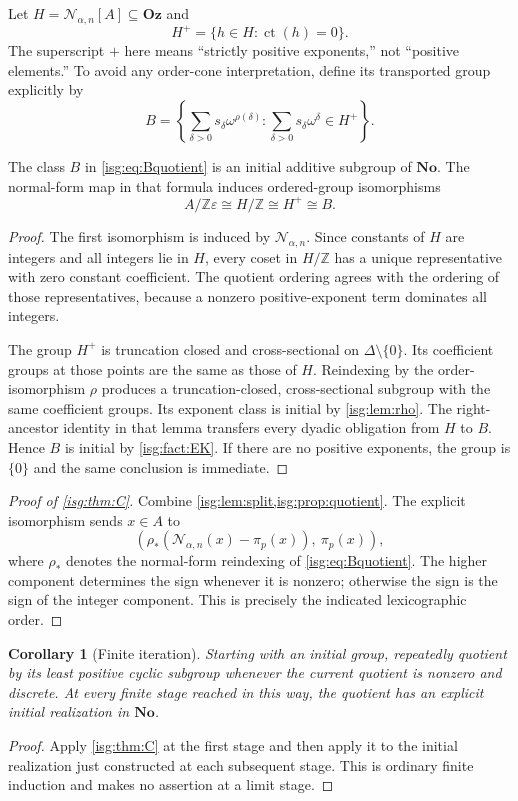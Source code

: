 \documentclass[11pt]{article}
\newtheorem{corollary}[corollary]{Corollary}
\theoremstyle{definition}
\theoremstyle{remark}
\newcommand{\No}{\ensuremath{\mathbf{No}}}
\newcommand{\Oz}{\ensuremath{\mathbf{Oz}}}
\newcommand{\Z}{\mathbb{Z}}
\newcommand{\Rect}{\mathcal{N}_{\alpha,n}}
\newcommand{\ct}{\operatorname{ct}}
\begin{document}
Let $H=\Rect[A]\subseteq\Oz$ and
\[
 H^+=\{h\in H:\ct(h)=0\}.
\]
The superscript $+$ here means ``strictly positive exponents,'' not
``positive elements.'' To avoid any order-cone interpretation, define
its transported group explicitly by
\begin{equation}\label{isg:eq:Bquotient}
 B=\left\{\sum_{\delta>0}s_\delta\omega^{\rho(\delta)}:
              \sum_{\delta>0}s_\delta\omega^\delta\in H^+\right\}.
\end{equation}

\begin{proposition}\label{isg:prop:quotient}
The class $B$ in \eqref{isg:eq:Bquotient} is an initial additive subgroup of
$\No$. The normal-form map in that formula induces ordered-group
isomorphisms
\[
 A/\Z\varepsilon\cong H/\Z\cong H^+\cong B.
\]
\end{proposition}
\begin{proof}
The first isomorphism is induced by $\Rect$. Since constants of $H$
are integers and all integers lie in $H$, every coset in $H/\Z$ has a
unique representative with zero constant coefficient. The quotient
ordering agrees with the ordering of those representatives, because a
nonzero positive-exponent term dominates all integers.

The group $H^+$ is truncation closed and cross-sectional on
$\Delta\setminus\{0\}$. Its coefficient groups at those points are
the same as those of $H$. Reindexing by the order-isomorphism $\rho$
produces a truncation-closed, cross-sectional subgroup with the same
coefficient groups. Its exponent class is initial by \cref{isg:lem:rho}.
The right-ancestor identity in that lemma transfers every dyadic
obligation from $H$ to $B$. Hence $B$ is initial by \cref{isg:fact:EK}.
If there are no positive exponents, the group is $\{0\}$ and the same
conclusion is immediate.
\end{proof}

\begin{proof}[Proof of \cref{isg:thm:C}]
Combine \cref{isg:lem:split,isg:prop:quotient}. The explicit isomorphism sends
$x\in A$ to
\[
 \left(\rho_*\left(\Rect(x)-\pi_p(x)\right),\ \pi_p(x)\right),
\]
where $\rho_*$ denotes the normal-form reindexing of
\eqref{isg:eq:Bquotient}. The higher component determines the sign whenever
it is nonzero; otherwise the sign is the sign of the integer component.
This is precisely the indicated lexicographic order.
\end{proof}

\begin{corollary}[Finite iteration]\label{isg:cor:iteration}
Starting with an initial group, repeatedly quotient by its least positive
cyclic subgroup whenever the current quotient is nonzero and discrete.
At every finite stage reached in this way, the quotient has an explicit
initial realization in $\No$.
\end{corollary}
\begin{proof}
Apply \cref{isg:thm:C} at the first stage and then apply it to the initial
realization just constructed at each subsequent stage. This is ordinary
finite induction and makes no assertion at a limit stage.
\end{proof}
\end{document}

